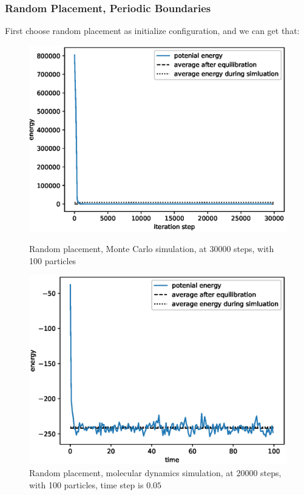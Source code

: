 \documentclass[UTF8,a4paper]{article}
\begin{document}
\subsubsection{Random Placement, Periodic Boundaries}
First choose random placement as initialize configuration, and we can get that:
\begin{figure}[H]
	\centering
	\begin{minipage}[t]{0.45\textwidth}
		\centering
		\includegraphics[height=0.2\textheight]{fig/plot_norand_30000_steps_100_particles_0.8442_rho_0.728_tempure_.eps}
		\caption{Random placement, Monte Carlo simulation, at 30000 steps, with 100 particles}
	\end{minipage}\hspace{0.5cm}
	\begin{minipage}[t]{0.45\textwidth}
		\centering
		\includegraphics[height=0.2\textheight]{fig/md_plot_20000_steps_100_particles_0.8442_rho_0.728_tempure_.eps}
		\caption{Random placement, molecular dynamics simulation, at 20000 steps, with 100 particles, time step is $0.05$}
	\end{minipage}
\end{figure}
\end{document}
